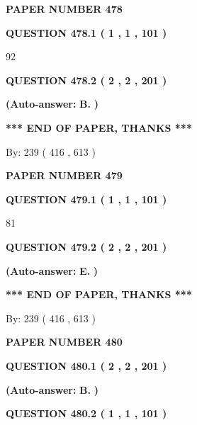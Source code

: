 \documentclass{ctexart}
\begin{document}
   
 {\textbf{ \Large{ PAPER NUMBER  478  }}}
   
   
   
   
  
  
{\textbf{\large{QUESTION
478.1 
 ( 1 , 1 , 101 )
}}}

92
  
  
{\textbf{\large{QUESTION
478.2 
 ( 2 , 2 , 201 )
}}}
 
 
{\textbf{(Auto-answer:}}
{\textbf{\large{
B.}}}
{\textbf{)}}
 
 
   
   
   
   
\vspace{1.0in} 
{\textbf{\large{ *** END OF PAPER, THANKS *** }}} 
   
   
\hspace{1.0in} By: 
 239 ( 416 ,  613 )
   
   
   
   
\newpage 
\setcounter{page}{ 
   479001 } 
   
   
 {\textbf{ \Large{ PAPER NUMBER  479  }}}
   
   
   
   
  
  
{\textbf{\large{QUESTION
479.1 
 ( 1 , 1 , 101 )
}}}

81
  
  
{\textbf{\large{QUESTION
479.2 
 ( 2 , 2 , 201 )
}}}
 
 
{\textbf{(Auto-answer:}}
{\textbf{\large{
E.}}}
{\textbf{)}}
 
 
   
   
   
   
\vspace{1.0in} 
{\textbf{\large{ *** END OF PAPER, THANKS *** }}} 
   
   
\hspace{1.0in} By: 
 239 ( 416 ,  613 )
   
   
   
   
\newpage 
\setcounter{page}{ 
   480001 } 
   
   
 {\textbf{ \Large{ PAPER NUMBER  480  }}}
   
   
   
   
  
  
{\textbf{\large{QUESTION
480.1 
 ( 2 , 2 , 201 )
}}}
 
 
{\textbf{(Auto-answer:}}
{\textbf{\large{
B.}}}
{\textbf{)}}
 
 
  
  
{\textbf{\large{QUESTION
480.2 
 ( 1 , 1 , 101 )
}}}
\end{document}
